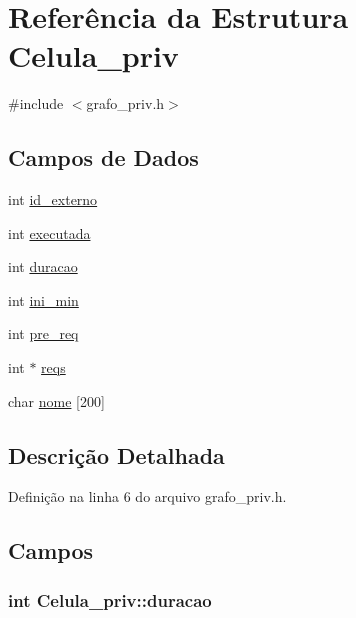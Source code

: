 \hypertarget{structCelula__priv}{}\section{Referência da Estrutura Celula\+\_\+priv}
\label{structCelula__priv}


{\ttfamily \#include $<$grafo\+\_\+priv.\+h$>$}

\subsection*{Campos de Dados}
\begin{DoxyCompactItemize}
\item 
int \hyperlink{structCelula__priv_a78a8525da28e1918d0faaf127001bd7b}{id\+\_\+externo}
\item 
int \hyperlink{structCelula__priv_af5f995caad41372e844f965021c5d183}{executada}
\item 
int \hyperlink{structCelula__priv_aee72d429cf8e17c945a1eb4e05ad85c7}{duracao}
\item 
int \hyperlink{structCelula__priv_a3c49601fe078bd7bb1512f0107af5301}{ini\+\_\+min}
\item 
int \hyperlink{structCelula__priv_a3ff8d3c4d0ba994771391320203619fc}{pre\+\_\+req}
\item 
int $\ast$ \hyperlink{structCelula__priv_ad54839cd4d96e78a58c226ab2e8d0579}{reqs}
\item 
char \hyperlink{structCelula__priv_a7f33fa72aceed7b44922f0f39d6f7f59}{nome} \mbox{[}200\mbox{]}
\end{DoxyCompactItemize}


\subsection{Descrição Detalhada}


Definição na linha 6 do arquivo grafo\+\_\+priv.\+h.



\subsection{Campos}
\hypertarget{structCelula__priv_aee72d429cf8e17c945a1eb4e05ad85c7}{}
\subsubsection[{duracao}]{\setlength{\rightskip}{0pt plus 5cm}int Celula\+\_\+priv\+::duracao}\label{structCelula__priv_aee72d429cf8e17c945a1eb4e05ad85c7}


